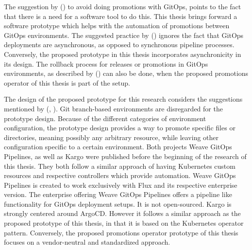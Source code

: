 The suggestion by \citeauthor{gitopsCloudnativeCDInnoq} (\citeyear{gitopsCloudnativeCDInnoq})
to avoid doing promotions with GitOps,
points to the fact that there is a need for a software tool
to do this. This thesis brings forward a software prototype
which helps with the automation of promotions between GitOps environments.
%
The suggested practice by \citeauthor{gitopsAndKubernetes2021continuous} (\citeyear{gitopsAndKubernetes2021continuous})
ignores the fact that GitOps deployments are asynchronous,
as opposed to synchronous pipeline processes.
Conversely, the proposed prototype in this thesis incorporates asynchronicity
in its design.
%
The rollback process for releases or promotions in GitOps environments,
as described by
\citeauthor{gitopsAndKubernetes2021continuous} (\citeyear{gitopsAndKubernetes2021continuous})
can also be done, when the proposed promotions operator
of this thesis is part of the setup.

The design of the proposed prototype for this research
considers the suggestions mentioned by
\citeauthor{codefreshHowToModelGitOpsEnvironmentsAndPromote} (\citeyear{codefreshStopUsingBranchesGitOpsEnvironments}, \citeyear{codefreshHowToModelGitOpsEnvironmentsAndPromote}).
Git branch-based environments are disregarded for the prototype design.
Because of the different categories of environment configuration,
the prototype design provides a way to promote specific files or directories,
meaning possibly any arbitrary resource,
while leaving other configuration specific to a certain environment.
%
Both projects Weave GitOps Pipelines, as well as Kargo
were published before the beginning of the research of this thesis.
They both follow a similar approach of having Kubernetes custom resources and respective
controllers which provide automation.
Weave GitOps Pipelines is created to work exclusively with Flux and its respective enterprise version.
The enterprise offering Weave GitOps Pipelines offers a pipeline like functionality
for GitOps deployment setups. It is not open-sourced.
Kargo is strongly centered around ArgoCD. However
it follows a similar approach as the proposed prototype of this thesis,
in that it is based on the Kubernetes operator pattern.
Conversely, the proposed promotions operator prototype of this thesis
focuses on a vendor-neutral and standardized approach.












